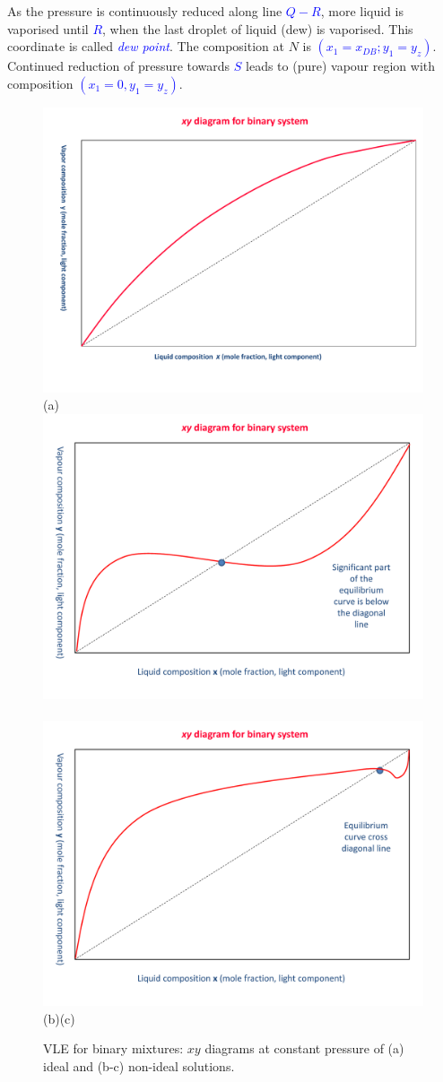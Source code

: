 \documentclass[12pts,a4paper,amsmath,amssymb,floatfix]{article}%
\newcommand{\blue}{\textcolor{blue}}
\begin{document}
As the pressure is continuously reduced along line \blue{$Q-R$}, more liquid is vaporised until \blue{$R$}, when the last droplet of liquid (dew) is vaporised. This coordinate is called \blue{\it dew point}. The composition at $N$ is \blue{$\left(x_{1}=x_{DB};y_{1}=y_{z}\right)$}. Continued reduction of pressure towards \blue{$S$} leads to (pure) vapour region with composition \blue{$\left(x_{1}=0,y_{1}=y_{z}\right)$}.
     \begin{figure}[h]
        \vbox{\hbox{\hspace{3.cm}\includegraphics[width=.6\linewidth,clip]{./../Pics/VLE_xy_DiagramIdeal}}
          \vspace{-.5cm}
          \hbox{\hspace{8.cm}(a)}
          \hbox{\hspace{-1.cm}\includegraphics[width=.5\linewidth,clip]{./../Pics/VLE_xy_DiagramNonIdeal1}
            \hspace{-0.cm}\includegraphics[width=.5\linewidth,clip]{./../Pics/VLE_xy_DiagramNonIdeal2}}
          \vspace{-.5cm}
          \hbox{\hspace{3.5cm}(b)\hspace{7.5cm}(c)}}
          \vspace{-.1cm}\caption{VLE for binary mixtures: $xy$ diagrams at constant pressure of (a) ideal and (b-c) non-ideal solutions.}\label{Mod04Fig04}
      \end{figure}
\end{document}
